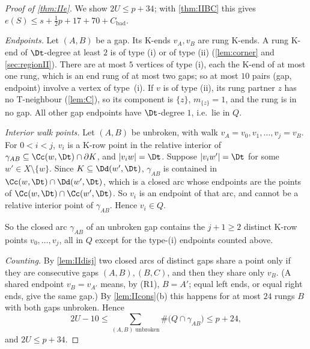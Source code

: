 \begin{proof}[Proof of \cref{thm:IIe}]
We show $2U\le p+34$; with \cref{thm:IIBC} this gives $e(S)\le s+\frac12p+17+70+C_{\mathrm{bad}}$.

\emph{Endpoints.} Let $(A,B)$ be a gap. Its K-ends $v_A,v_B$ are rung K-ends. A rung K-end of $\Dt$-degree at least $2$ is of type (i) or of type (ii) (\cref{lem:corner} and \cref{sec:regionII}). There are at most $5$ vertices of type (i), each the K-end of at most one rung, which is an end rung of at most two gaps; so at most $10$ pairs (gap, endpoint) involve a vertex of type~(i). If $v$ is of type (ii), its rung partner $z$ has no T-neighbour (\cref{lem:C}), so its component is $\{z\}$, $m_{\{z\}}=1$, and the rung is in no gap. All other gap endpoints have $\Dt$-degree $1$, i.e.\ lie in $Q$.

\emph{Interior walk points.} Let $(A,B)$ be unbroken, with walk $v_A=v_0,v_1,\dots,v_j=v_B$. For $0<i<j$, $v_i$ is a K-row point in the relative interior of $\gamma_{AB}\subseteq\Cc(w,\Dt)\cap\partial K$, and $|v_iw|=\Dt$. Suppose $|v_iw'|=\Dt$ for some $w'\in X\setminus\{w\}$. Since $K\subseteq\Dd(w',\Dt)$, $\gamma_{AB}$ is contained in $\Cc(w,\Dt)\cap\Dd(w',\Dt)$, which is a closed arc whose endpoints are the points of $\Cc(w,\Dt)\cap\Cc(w',\Dt)$. So $v_i$ is an endpoint of that arc, and cannot be a relative interior point of $\gamma_{AB}$. Hence $v_i\in Q$.

So the closed arc $\gamma_{AB}$ of an unbroken gap contains the $j+1\ge2$ distinct K-row points $v_0,\dots,v_j$, all in $Q$ except for the type-(i) endpoints counted above.

\emph{Counting.} By \cref{lem:IIdisj} two closed arcs of distinct gaps share a point only if they are consecutive gaps $(A,B),(B,C)$, and then they share only $v_B$. (A shared endpoint $v_B=v_{A'}$ means, by (R1), $B=A'$; equal left ends, or equal right ends, give the same gap.) By \cref{lem:IIcons}(b) this happens for at most $24$ rungs $B$ with both gaps unbroken. Hence
\[
2U-10\le\sum_{(A,B)\text{ unbroken}}\#\bigl(Q\cap\gamma_{AB}\bigr)\le p+24,
\]
and $2U\le p+34$.
\end{proof}

